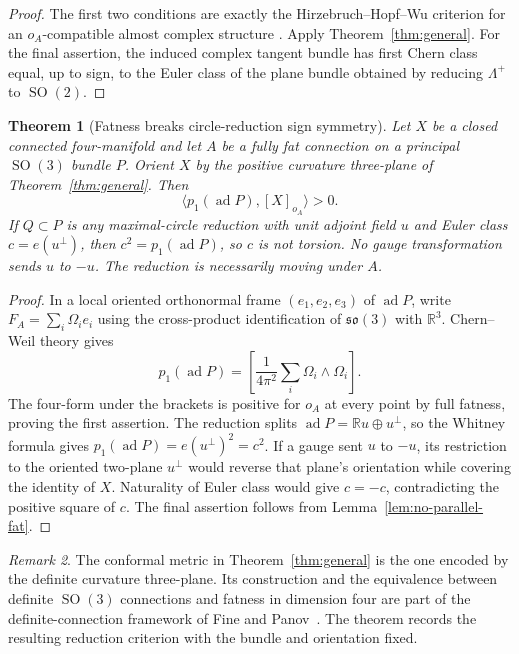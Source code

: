 \documentclass[11pt]{amsart}
\newcommand{\ad}{\operatorname{ad}}
\newcommand{\SO}{\operatorname{SO}}
\newcommand{\R}{\mathbb R}
\theoremstyle{plain}
\newtheorem{theorem}{Theorem}[section]
\theoremstyle{definition}
\theoremstyle{remark}
\newtheorem{remark}[theorem]{Remark}
\begin{document}
\begin{proof}
The first two conditions are exactly the Hirzebruch--Hopf--Wu
criterion for an $o_A$-compatible almost complex structure
\cite{HirzebruchHopf}.  Apply Theorem~\ref{thm:general}.  For the final
assertion, the induced complex tangent bundle has first Chern class
equal, up to sign, to the Euler class of the plane bundle obtained by
reducing $\Lambda^+$ to $\SO(2)$.
\end{proof}

\begin{theorem}[Fatness breaks circle-reduction sign symmetry]\label{thm:fat-mirror}
Let $X$ be a closed connected four-manifold and let $A$ be a fully fat connection on a principal $\SO(3)$ bundle $P$.  Orient $X$ by the positive curvature three-plane of Theorem~\ref{thm:general}.  Then
\[
 \langle p_1(\ad P),[X]_{o_A}\rangle>0.
\]
If $Q\subset P$ is any maximal-circle reduction with unit adjoint field $u$ and Euler class $c=e(u^\perp)$, then $c^2=p_1(\ad P)$, so $c$ is not torsion.  No gauge transformation sends $u$ to $-u$.  The reduction is necessarily moving under $A$.
\end{theorem}

\begin{proof}
In a local oriented orthonormal frame $(e_1,e_2,e_3)$ of $\ad P$, write $F_A=\sum_i\Omega_i e_i$ using the cross-product identification of $\mathfrak{so}(3)$ with $\R^3$.  Chern--Weil theory gives
\[
 p_1(\ad P)=\left[\frac{1}{4\pi^2}\sum_i\Omega_i\wedge\Omega_i\right].
\]
The four-form under the brackets is positive for $o_A$ at every point by full fatness, proving the first assertion.  The reduction splits $\ad P=\R u\oplus u^\perp$, so the Whitney formula gives $p_1(\ad P)=e(u^\perp)^2=c^2$.  If a gauge sent $u$ to $-u$, its restriction to the oriented two-plane $u^\perp$ would reverse that plane's orientation while covering the identity of $X$.  Naturality of Euler class would give $c=-c$, contradicting the positive square of $c$.  The final assertion follows from Lemma~\ref{lem:no-parallel-fat}.
\end{proof}

\begin{remark}
The conformal metric in Theorem~\ref{thm:general} is the one encoded
by the definite curvature three-plane.  Its construction and the
equivalence between definite $\SO(3)$ connections and fatness in
dimension four are part of the definite-connection framework of
Fine and Panov~\cite[Sections~2.1--2.2]{FP}.  The theorem records the
resulting reduction criterion with the bundle and orientation fixed.
\end{remark}
\end{document}
